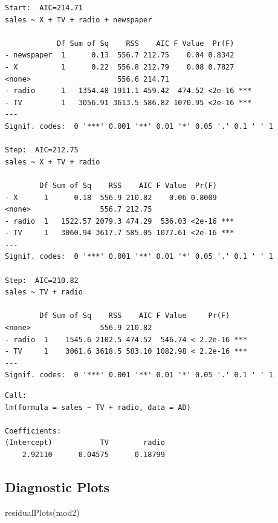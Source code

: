 \documentclass[
]{article}
\newenvironment{Shaded}{\begin{snugshade}}{\end{snugshade}}
\newcommand{\FunctionTok}[1]{\textcolor[rgb]{0.00,0.00,0.00}{#1}}
\newcommand{\NormalTok}[1]{#1}
\begin{document}
\begin{verbatim}
Start:  AIC=214.71
sales ~ X + TV + radio + newspaper

            Df Sum of Sq    RSS    AIC F Value  Pr(F)    
- newspaper  1      0.13  556.7 212.75    0.04 0.8342    
- X          1      0.22  556.8 212.79    0.08 0.7827    
<none>                    556.6 214.71                   
- radio      1   1354.48 1911.1 459.42  474.52 <2e-16 ***
- TV         1   3056.91 3613.5 586.82 1070.95 <2e-16 ***
---
Signif. codes:  0 '***' 0.001 '**' 0.01 '*' 0.05 '.' 0.1 ' ' 1

Step:  AIC=212.75
sales ~ X + TV + radio

        Df Sum of Sq    RSS    AIC F Value  Pr(F)    
- X      1      0.18  556.9 210.82    0.06 0.8009    
<none>                556.7 212.75                   
- radio  1   1522.57 2079.3 474.29  536.03 <2e-16 ***
- TV     1   3060.94 3617.7 585.05 1077.61 <2e-16 ***
---
Signif. codes:  0 '***' 0.001 '**' 0.01 '*' 0.05 '.' 0.1 ' ' 1

Step:  AIC=210.82
sales ~ TV + radio

        Df Sum of Sq    RSS    AIC F Value     Pr(F)    
<none>                556.9 210.82                      
- radio  1    1545.6 2102.5 474.52  546.74 < 2.2e-16 ***
- TV     1    3061.6 3618.5 583.10 1082.98 < 2.2e-16 ***
---
Signif. codes:  0 '***' 0.001 '**' 0.01 '*' 0.05 '.' 0.1 ' ' 1
\end{verbatim}

\begin{verbatim}
Call:
lm(formula = sales ~ TV + radio, data = AD)

Coefficients:
(Intercept)           TV        radio  
    2.92110      0.04575      0.18799  
\end{verbatim}

\hypertarget{diagnostic-plots}{%
\subsection{Diagnostic Plots}\label{diagnostic-plots}}

\begin{Shaded}
\begin{Highlighting}[]
\FunctionTok{residualPlots}\NormalTok{(mod2)}
\end{Highlighting}
\end{Shaded}
\end{document}
